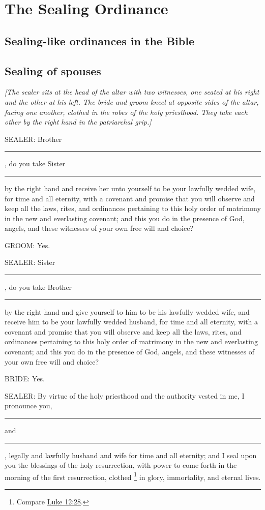 \section{The Sealing Ordinance}
	\label{TEMPLE-ENDOWMENT-SEALING}
	
	\subsection{Sealing-like ordinances in the Bible}
	
	\subsection{Sealing of spouses}
	
		\textit{[The sealer sits at the head of the altar with two witnesses, one seated at his right and the other at his left. The bride and groom kneel at opposite sides of the altar, facing one another, clothed in the robes of the holy priesthood. They take each other by the right hand in the patriarchal grip.]}
	
		SEALER: Brother \rule{1cm}{0.15mm}, do you take Sister \rule{1cm}{0.15mm} by the right hand and receive her unto yourself to be your lawfully wedded wife, for time and all eternity, with a covenant and promise that you will observe and keep all the laws, rites, and ordinances pertaining to this holy order of matrimony in the new and everlasting covenant; and this you do in the presence of God, angels, and these witnesses of your own free will and choice?

		GROOM: Yes.

		SEALER: Sister \rule{1cm}{0.15mm}, do you take Brother \rule{1cm}{0.15mm} by the right hand and give yourself to him to be his lawfully wedded wife, and receive him to be your lawfully wedded husband, for time and all eternity, with a covenant and promise that you will observe and keep all the laws, rites, and ordinances pertaining to this holy order of matrimony in the new and everlasting covenant; and this you do in the presence of God, angels, and these witnesses of your own free will and choice?

		BRIDE: Yes.

		SEALER: By virtue of the holy priesthood and the authority vested in me, I pronounce you, \rule{1cm}{0.15mm} and \rule{1cm}{0.15mm}, legally and lawfully husband and wife for time and all eternity; and I seal upon you the blessings of the holy resurrection, with power to come forth in the morning of the first resurrection, clothed%
			\footnote{%
				Compare \hyperref[LUKE-12-28]{Luke 12:28}. 	
				}
		in glory, immortality, and eternal lives.


